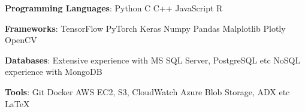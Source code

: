 \textbf{Programming Languages}: Python {\scalerel*{\cdot}{\bigodot}} C {\scalerel*{\cdot}{\bigodot}} C++ {\scalerel*{\cdot}{\bigodot}} JavaScript {\scalerel*{\cdot}{\bigodot}} R

\textbf{Frameworks}: TensorFlow {\scalerel*{\cdot}{\bigodot}} PyTorch {\scalerel*{\cdot}{\bigodot}} Keras {\scalerel*{\cdot}{\bigodot}} Numpy {\scalerel*{\cdot}{\bigodot}} Pandas {\scalerel*{\cdot}{\bigodot}} Malplotlib {\scalerel*{\cdot}{\bigodot}} Plotly {\scalerel*{\cdot}{\bigodot}} OpenCV

\textbf{Databases}: Extensive experience with MS SQL Server, PostgreSQL etc {\scalerel*{\cdot}{\bigodot}} NoSQL experience with MongoDB

\textbf{Tools}: Git {\scalerel*{\cdot}{\bigodot}} Docker {\scalerel*{\cdot}{\bigodot}} AWS EC2, S3, CloudWatch {\scalerel*{\cdot}{\bigodot}} Azure Blob Storage, ADX etc {\scalerel*{\cdot}{\bigodot}} \LaTeX{}

